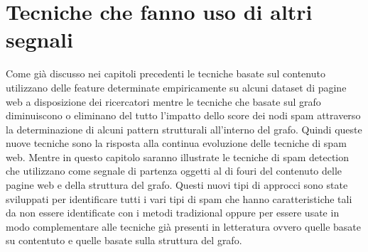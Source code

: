 \chapter{Tecniche che fanno uso di altri segnali}
 Come già discusso nei capitoli precedenti le tecniche basate sul contenuto utilizzano delle feature determinate empiricamente su alcuni dataset di pagine web a disposizione dei ricercatori mentre le tecniche che basate sul grafo diminuiscono o eliminano del tutto l'impatto dello score dei nodi spam attraverso la determinazione di alcuni pattern strutturali all'interno del grafo.  Quindi queste nuove tecniche sono la risposta alla continua evoluzione delle tecniche di spam web. Mentre in questo capitolo saranno illustrate le tecniche di spam detection che utilizzano come segnale di partenza oggetti al di fouri del contenuto delle pagine web e della struttura del grafo. Questi nuovi tipi di approcci sono state sviluppati per identificare tutti i vari tipi di spam che hanno caratteristiche tali da non essere identificate con i metodi tradizional oppure per essere usate in modo complementare alle tecniche già presenti in letteratura ovvero quelle basate su contentuto e quelle basate sulla struttura del grafo. 


